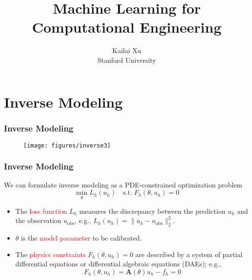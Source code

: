 \documentclass[usenames,dvipsnames]{beamer}
\title[Kailai Xu]{Machine Learning for Computational Engineering} %
\author[Kailai Xu]{Kailai Xu \\ Stanford University} %
\date{}%
\begin{document}
\begin{frame}

\titlepage %

\end{frame}
\usebackgroundtemplate{}

\section{Inverse Modeling}



\begin{frame}
	\frametitle{Inverse Modeling}
	\begin{figure}
		\centering
		\texttt{[image: figures/inverse3]}
	\end{figure}
\end{frame}



\begin{frame}
	\frametitle{Inverse Modeling}
	We can formulate inverse modeling as a PDE-constrained optimization problem 
	\begin{equation*}
		\min_{\theta} L_h(u_h) \quad \mathrm{s.t.}\; F_h(\theta, u_h) = 0
	\end{equation*}
	\begin{itemize}
		\item The \textcolor{red}{loss function} $L_h$ measures the discrepancy between the prediction $u_h$ and the observation $u_{\mathrm{obs}}$, e.g., $L_h(u_h) = \|u_h - u_{\mathrm{obs}}\|_2^2$. 
		\item $\theta$ is the \textcolor{red}{model parameter} to be calibrated. 
		\item The \textcolor{red}{physics constraints} $F_h(\theta, u_h)=0$ are described by a system of partial differential equations or differential algebraic equations (DAEs); e.g., 
		$$F_h(\theta, u_h) = \mathbf{A}(\theta) u_h - f_h = 0$$
	\end{itemize}
\end{frame}
\end{document}
